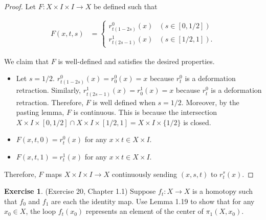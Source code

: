 \documentclass[12pt, psamsfonts]{amsart}
\theoremstyle{definition}
\newtheorem{exer}[thm]{Exercise}
\theoremstyle{remark}
\numberwithin{equation}{section}
\begin{document}
\begin{proof}
  Let $F: X \times I \times I \rightarrow X$ be defined such that

  \begin{align*}
    F(x, t, s) &= \begin{cases}
      r_{t(1 - 2s)}^0(x) & (s \in [0, 1/2]) \\
      r_{t(2s - 1)}^1(x) & (s \in [1/2, 1]).
    \end{cases}
  \end{align*}

  We claim that $F$ is well-defined and satisfies the desired properties.

  \begin{itemize}
    \item
      Let $s = 1 / 2$.
      $r_{t(1 - 2s)}^0(x) = r_0^0(x) = x$ because $r^0_t$ is a deformation retraction.
      Similarly, $r_{t(2s - 1)}^1(x) = r_0^1(x) = x$ because $r^0_t$ is a deformation retraction.
      Therefore, $F$ is well defined when $s = 1/2$.
      Moreover, by the pasting lemma, $F$ is continuous.
      This is because the intersection $X \times I \times [0, 1/2] \cap X \times I \times [1/2, 1] = X \times I \times \{ 1/2 \}$ is closed.
    \item
      $F(x, t, 0) = r_t^0(x)$ for any $x \times t \in X \times I$.
    \item
      $F(x, t, 1) = r_t^1(x)$ for any $x \times t \in X \times I$.
  \end{itemize}

  Therefore, $F$ maps $X \times I \times I \rightarrow X$ continuously sending $(x, s, t)$ to $r^s_t(x)$.
\end{proof}

\begin{exer}{(Exercise 20, Chapter 1.1)}
  Suppose $f_t: X \rightarrow X$ is a homotopy such that $f_0$ and $f_1$ are each the identity map.
  Use Lemma 1.19 to show that for any $x_0 \in X$, the loop $f_t(x_0)$ represents an element of the center of $\pi_1(X, x_0)$.
\end{exer}
\end{document}

